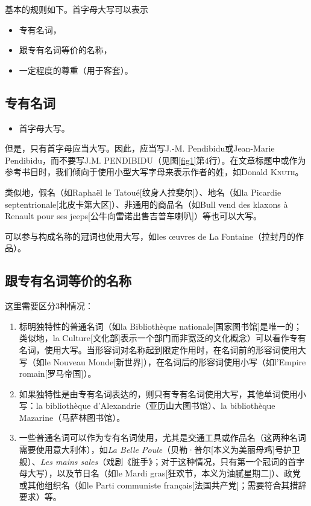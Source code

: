 基本的规则如下。首字母大写可以表示

\begin{itemize}
    \item 专有名词，
    \item 跟专有名词等价的名称，
    \item 一定程度的尊重（用于客套）。
\end{itemize}

\subsection{专有名词}

\begin{itemize}
    \item 首字母大写。
\end{itemize}

但是，只有首字母应当大写。因此，应当写J.-M. Pendibidu或Jean-Marie Pendibidu，而不要写J.M. PENDIBIDU（见图\ref{fig1}第4行）。在文章标题中或作为参考书目时，我们倾向于使用小型大写字母来表示作者的姓，如Donald \textsc{Knuth}。

类似地，假名（如Raphaël le Tatoué[纹身人拉斐尔]）、地名（如la Picardie septentrionale[北皮卡第大区]）、非通用的商品名（如Bull vend des klaxons à Renault pour ses jeeps[公牛向雷诺出售吉普车喇叭]）等也可以大写。

可以参与构成名称的冠词也使用大写，如les œuvres de La Fontaine（拉封丹的作品）。

\subsection{跟专有名词等价的名称}

这里需要区分3种情况：

\begin{enumerate}
    \item 标明独特性的普通名词（如la Bibliothèque nationale[国家图书馆]是唯一的；类似地，la Culture[文化部]表示一个部门而非宽泛的文化概念）可以看作专有名词，使用大写。当形容词对名称起到限定作用时，在名词前的形容词使用大写（如le Nouveau Monde[新世界]），在名词后的形容词使用小写（如l'Empire romain[罗马帝国]）。
    \item 如果独特性是由专有名词表达的，则只有专有名词使用大写，其他单词使用小写：la bibliothèque d'Alexandrie（亚历山大图书馆）、la bibliothèque Mazarine（马萨林图书馆）。
    \item 一些普通名词可以作为专有名词使用，尤其是交通工具或作品名（这两种名词需要使用意大利体），如\emph{La Belle Poule}（贝勒·普尔[本义为美丽母鸡]号护卫舰）、\emph{Les mains sales}（戏剧《脏手》；对于这种情况，只有第一个冠词的首字母大写），以及节日名（如le Mardi gras[狂欢节，本义为油腻星期二]）、政党或其他组织名（如le Parti communiste français[法国共产党]；需要符合其措辞要求）等。
\end{enumerate}

